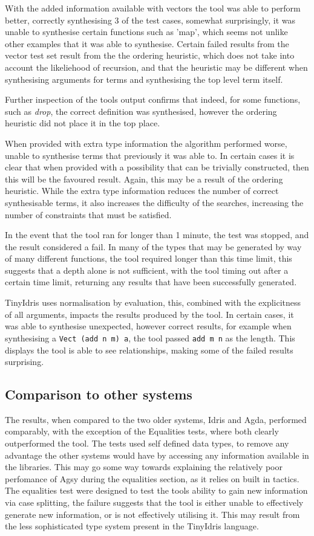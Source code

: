 \documentclass[a4paper]{article}
\begin{document}
With the added information available with vectors the tool was 
able to perform better, correctly synthesising 3 of the test cases,
somewhat surprisingly, it was unable to synthesise certain functions
such as 'map', which seems not unlike other examples that it was able 
to synthesise. Certain failed results from the vector test set result
from the the ordering heuristic, which does not take into account the
likeliehood of recursion, and that the heuristic may be different
when synthesising arguments for terms and synthesising the top level
term itself.

Further inspection of the tools output confirms that indeed, for some
functions, such as \textit{drop}, the correct definition was
synthesised, however the ordering heuristic did not place it in the
top place. 

When provided with extra  type information the algorithm performed
worse, unable to synthesise terms that previously it was able to.
In certain cases it is clear that when provided with a possibility
that can be trivially constructed, then this will be the favoured
result. Again, this may be a result of the ordering heuristic.
While the extra type information reduces the number of correct 
synthesisable terms, it also increases the difficulty of the 
searches, increasing the number of constraints that must be satisfied. 

In the event that the tool ran for longer than 1 minute, the
test was stopped, and the result considered a fail. In many of
the types that may be generated by way of many different
functions, the tool required longer than this time limit, this suggests
that a depth alone is not sufficient, with the tool timing out after
a certain time limit, returning any results that have been successfully
generated. 

TinyIdris uses normalisation by evaluation, this, combined with the
explicitness of all arguments, impacts the results
produced by the tool. In certain cases, it was able to synthesise
unexpected, however correct results, for example when synthesising a
\texttt{Vect (add n m) a}, the tool passed \texttt{add m n} as the
length. This displays the tool is able to see relationships, making
some of the failed results surprising.

\subsection{Comparison to other systems}
\label{sec:orga2f8b7e}
The results, when compared to the two older systems, Idris and Agda, 
performed comparably, with the exception of the Equalities tests,
where both clearly outperformed the tool. The tests used self defined
data types, to remove any advantage the other systems would have by
accessing any information available in the libraries. This may go some
way towards explaining the relatively poor perfomance of Agsy during
the equalities section, as it relies on built in tactics.
The equalities test were designed to test the
tools ability to gain new information via case splitting, the failure
suggests that the tool is either unable to effectively generate new
information, or is not effectively utilising it. This may result from
the less sophisticated type system present in the TinyIdris language.
\end{document}
